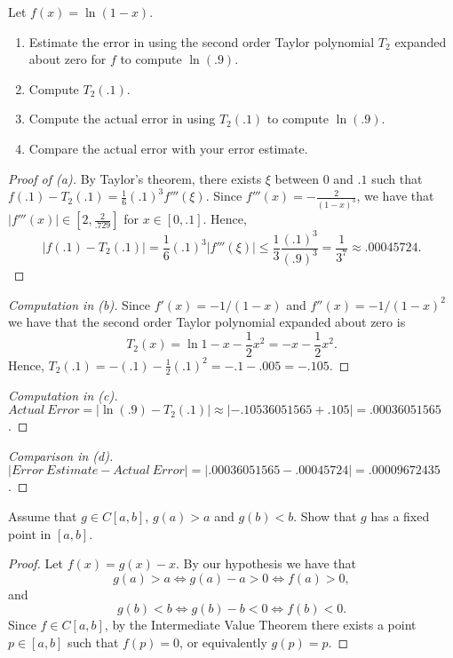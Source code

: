 \documentclass[8pt]{article}
\theoremstyle{definition}
\newenvironment{exercise}[1]
  {\renewcommand\theinnerexercise{#1}\innerexercise}
  {\endinnerexercise}
\begin{document}
\begin{exercise}{2}
	Let $f(x) = \ln (1 - x)$.
	\begin{enumerate}
		\item[(a)] Estimate the error in using the second order Taylor polynomial $T_2$ expanded about zero for $f$ to compute $\ln (.9)$.
		\item[(b)] Compute $T_2 (.1)$.
		\item[(c)] Compute the actual error in using $T_2 (.1)$ to compute $\ln (.9)$.
		\item[(d)] Compare the actual error with your error estimate.
	\end{enumerate}
\end{exercise}
\begin{proof}[Proof of (a)]
By Taylor's theorem, there exists $\xi$ between $0$ and $.1$ such that $f(.1) - T_2 (.1) = \frac{1}{6} (.1)^3 f'''(\xi)$. Since $f'''(x) = -\frac{2}{(1 - x)^3}$, we have that $|f'''(x)| \in [2, \frac{2}{.729}]$ for $x \in [0, .1]$. Hence, $$|f(.1) - T_2 (.1)| = \frac{1}{6} (.1)^3 |f'''(\xi)| \leq \frac{1}{3} \frac{(.1)^3}{(.9)^3} = \frac{1}{3^7} \approx .00045724.$$
\end{proof}

\begin{proof}[Computation in (b)]
Since $f' (x) = -1/(1 - x)$ and $f'' (x) = -1/(1 - x)^2$ we have that the second order Taylor polynomial expanded about zero is $$T_2 (x) = \ln 1 - x - \frac{1}{2} x^2 = -x - \frac{1}{2} x^2.$$ Hence, $T_2 (.1) = - (.1) - \frac{1}{2} (.1)^2 = -.1 - .005 = -.105$.
\end{proof}

\begin{proof}[Computation in (c)]
$Actual \ Error = | \ln (.9) - T_2(.1) | \approx |-.10536051565 + .105 | = .00036051565$.
\end{proof}

\begin{proof}[Comparison in (d)]
$| Error \ Estimate - Actual \ Error | = | .00036051565 - .00045724 | = .00009672435$.
\end{proof}

\begin{exercise}{3}
Assume that $g \in C [a,b]$, $g(a) > a$ and $g (b) < b$. Show that $g$ has a fixed point in $[a, b]$.
\end{exercise}
\begin{proof}
Let $f(x) = g(x) - x$. By our hypothesis we have that $$g(a) > a \Leftrightarrow g(a) - a > 0 \Leftrightarrow f(a) > 0,$$ and $$g(b) < b \Leftrightarrow g(b) - b < 0 \Leftrightarrow f(b) < 0.$$ Since $f \in C[a,b]$, by the Intermediate Value Theorem there exists a point $p \in [a, b]$ such that $f(p) = 0$, or equivalently $g(p) = p$.
\end{proof}
\end{document}
